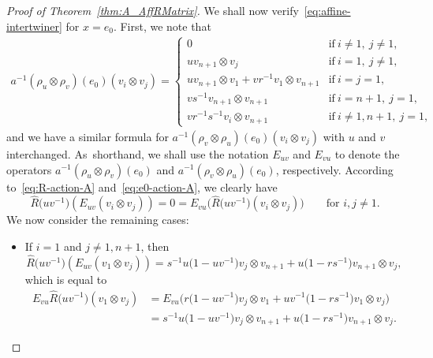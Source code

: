 \documentclass[10pt,a4paper]{amsart}
\numberwithin{equation}{section}
\begin{document}
\begin{proof}[Proof of Theorem~\ref{thm:A_AffRMatrix}]
We shall now verify~\eqref{eq:affine-intertwiner} for $x = e_{0}$. First, we note that
\begin{gather}\label{eq:e0-action-A}
 a^{-1}(\rho_{u} \otimes \rho_{v})(e_{0})(v_{i} \otimes v_{j}) =
 \begin{cases}
 0 & \text{if}\ i \neq 1,\ j \neq 1, \\
 u v_{n+1} \otimes v_{j} & \text{if}\ i = 1,\ j \neq 1, \\
 u v_{n+1} \otimes v_{1} + vr^{-1} v_{1} \otimes v_{n+1} & \text{if}\ i = j = 1, \\
 vs^{-1} v_{n+1} \otimes v_{n+1} & \text{if}\ i = n + 1,\ j = 1 ,\\
 vr^{-1}s^{-1} v_{i} \otimes v_{n+1} & \text{if}\ i \neq 1,n+1,\ j = 1,
 \end{cases}
\end{gather}
and we have a similar formula for $a^{-1}(\rho_{v} \otimes \rho_{u})(e_{0})(v_{i} \otimes v_{j})$ with $u$ and $v$ interchanged. As~short\-hand, we shall use the notation $E_{uv}$ and $E_{vu}$ to denote the operators $a^{-1}(\rho_{u} \otimes \rho_{v})(e_{0})$ and $a^{-1}(\rho_{v} \otimes \rho_{u})(e_{0})$, respectively. According to~\eqref{eq:R-action-A} and~\eqref{eq:e0-action-A}, we clearly have
\[
\hat{R}\bigl(uv^{-1}\bigr)(E_{uv}(v_{i} \otimes v_{j})) = 0 =  E_{vu}\bigl(\hat{R}\bigl(uv^{-1}\bigr)(v_{i} \otimes v_{j})\bigr)
\qquad \text{for $i,j \neq 1$.}
\]
 We now consider the remaining cases:
\begin{itemize}\itemsep=0pt
\item
If $i = 1$ and $j \neq 1,n+1$, then
\begin{displaymath}
 \hat{R}\bigl(uv^{-1}\bigr)(E_{uv}(v_{1} \otimes v_{j})) =
 s^{-1}u\bigl(1 - uv^{-1}\bigr)v_{j} \otimes v_{n+ 1} + u\bigl(1 - rs^{-1}\bigr)v_{n+1} \otimes v_{j},
\end{displaymath}
which is equal to
\begin{displaymath}
\begin{split}
 E_{vu}\hat{R}\bigl(uv^{-1}\bigr)(v_{1} \otimes v_{j})
 & = E_{vu}\bigl(r\bigl(1 - uv^{-1}\bigr)v_{j} \otimes v_{1} + uv^{-1}\bigl(1 - rs^{-1}\bigr)v_{1} \otimes v_{j}\bigr) \\
 & = s^{-1}u\bigl(1 - uv^{-1}\bigr)v_{j} \otimes v_{n + 1} + u\bigl(1 - rs^{-1}\bigr)v_{n+1} \otimes v_{j}.
\end{split}
\end{displaymath}


\end{itemize}
\end{proof}
\end{document}
